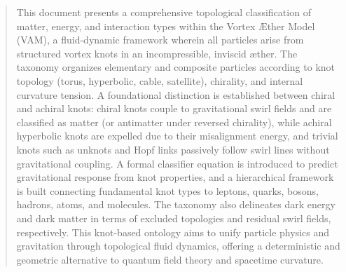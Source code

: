 \documentclass[12pt]{article}
\begin{document}
  \titlepageOpen

  \begin{abstract}
        This document presents a comprehensive topological classification of matter, energy, and interaction types within the Vortex Æther Model (VAM), a fluid-dynamic framework wherein all particles arise from structured vortex knots in an incompressible, inviscid æther. The taxonomy organizes elementary and composite particles according to knot topology (torus, hyperbolic, cable, satellite), chirality, and internal curvature tension. A foundational distinction is established between chiral and achiral knots: chiral knots couple to gravitational swirl fields and are classified as matter (or antimatter under reversed chirality), while achiral hyperbolic knots are expelled due to their misalignment energy, and trivial knots such as unknots and Hopf links passively follow swirl lines without gravitational coupling. A formal classifier equation is introduced to predict gravitational response from knot properties, and a hierarchical framework is built connecting fundamental knot types to leptons, quarks, bosons, hadrons, atoms, and molecules. The taxonomy also delineates dark energy and dark matter in terms of excluded topologies and residual swirl fields, respectively. This knot-based ontology aims to unify particle physics and gravitation through topological fluid dynamics, offering a deterministic and geometric alternative to quantum field theory and spacetime curvature.


        \begin{figure}[H]
            \centering
            \footnotesize
\end{figure}
\end{abstract}
\end{document}
